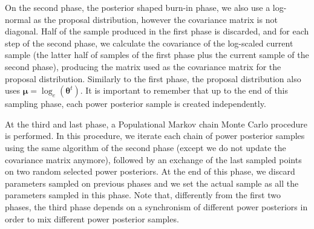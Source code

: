 On the second phase, the posterior shaped burn-in phase, we also use a 
log-normal as the proposal distribution, however the covariance matrix is 
not diagonal. Half of the sample produced in the first phase is
discarded, and for each step of the second phase, we calculate the 
covariance of the log-scaled current sample (the latter half of samples
of the first phase plus the current sample of the second phase), 
producing the matrix used as the covariance matrix for the proposal distribution. Similarly to the first phase, the
proposal distribution also uses ${\bm \mu} = \log_e({\bm \theta}^t)$. It
is important to remember that up to the end of this sampling phase, each
power posterior sample is created independently.

At the third and last phase, a Populational Markov chain Monte Carlo 
procedure is performed. In this procedure, we iterate each chain of 
power posterior samples using the same algorithm of the second phase
(except we do not update the covariance matrix anymore), followed by an 
exchange of the last sampled points on two random selected power 
posteriors. At the end of this phase, we discard parameters sampled on 
previous phases and we set the actual sample as all the parameters 
sampled in this phase. Note that, differently from the first two phases,
the third phase depends on a synchronism of different power posteriors
in order to mix different power posterior samples.

